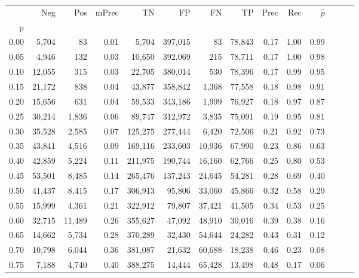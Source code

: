 \begin{tabular}{rrrrrrrrrrrrrr}
\toprule
{} &     Neg &     Pos & mPrec &       TN &       FP &      FN &      TP &  Prec &   Rec & $\hat{p}$ \\
p    &         &         &       &          &          &         &         &       &       &           \\
\midrule
0.00 &   5,704 &      83 &  0.01 &    5,704 &  397,015 &      83 &  78,843 &  0.17 &  1.00 &      0.99 \\
0.05 &   4,946 &     132 &  0.03 &   10,650 &  392,069 &     215 &  78,711 &  0.17 &  1.00 &      0.98 \\
0.10 &  12,055 &     315 &  0.03 &   22,705 &  380,014 &     530 &  78,396 &  0.17 &  0.99 &      0.95 \\
0.15 &  21,172 &     838 &  0.04 &   43,877 &  358,842 &   1,368 &  77,558 &  0.18 &  0.98 &      0.91 \\
0.20 &  15,656 &     631 &  0.04 &   59,533 &  343,186 &   1,999 &  76,927 &  0.18 &  0.97 &      0.87 \\
0.25 &  30,214 &   1,836 &  0.06 &   89,747 &  312,972 &   3,835 &  75,091 &  0.19 &  0.95 &      0.81 \\
0.30 &  35,528 &   2,585 &  0.07 &  125,275 &  277,444 &   6,420 &  72,506 &  0.21 &  0.92 &      0.73 \\
0.35 &  43,841 &   4,516 &  0.09 &  169,116 &  233,603 &  10,936 &  67,990 &  0.23 &  0.86 &      0.63 \\
0.40 &  42,859 &   5,224 &  0.11 &  211,975 &  190,744 &  16,160 &  62,766 &  0.25 &  0.80 &      0.53 \\
0.45 &  53,501 &   8,485 &  0.14 &  265,476 &  137,243 &  24,645 &  54,281 &  0.28 &  0.69 &      0.40 \\
0.50 &  41,437 &   8,415 &  0.17 &  306,913 &   95,806 &  33,060 &  45,866 &  0.32 &  0.58 &      0.29 \\
0.55 &  15,999 &   4,361 &  0.21 &  322,912 &   79,807 &  37,421 &  41,505 &  0.34 &  0.53 &      0.25 \\
0.60 &  32,715 &  11,489 &  0.26 &  355,627 &   47,092 &  48,910 &  30,016 &  0.39 &  0.38 &      0.16 \\
0.65 &  14,662 &   5,734 &  0.28 &  370,289 &   32,430 &  54,644 &  24,282 &  0.43 &  0.31 &      0.12 \\
0.70 &  10,798 &   6,044 &  0.36 &  381,087 &   21,632 &  60,688 &  18,238 &  0.46 &  0.23 &      0.08 \\
0.75 &   7,188 &   4,740 &  0.40 &  388,275 &   14,444 &  65,428 &  13,498 &  0.48 &  0.17 &      0.06 \\

\end{tabular}
